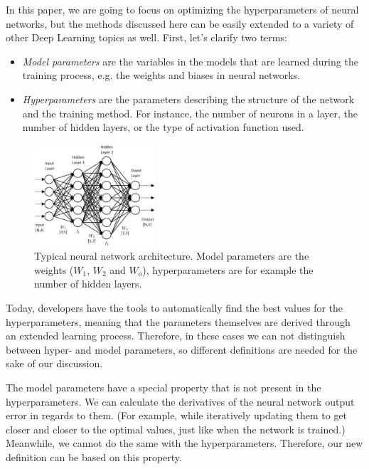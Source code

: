 \documentclass[conference]{IEEEtran}
\begin{document}
In this paper, we are going to focus on optimizing the hyperparameters of neural networks, but the methods discussed  here can be easily extended to a variety of other Deep Learning topics as well. First, let’s clarify two terms:
\begin{itemize}
    \item \emph{Model parameters} are the variables in the models that are learned during the training process, e.g. the weights and biases in neural networks.
    \item \emph{Hyperparameters} are the parameters describing the structure of the network and the training method. For instance, the number of neurons in a layer, the number of hidden layers, or the type of activation function used.
\end{itemize}

\begin{figure}[htbp]
\centerline{\includegraphics[width=0.4\textwidth]{nn.PNG}}
\caption{Typical neural network architecture. \cite{nn_arch} Model parameters are the weights ($W_{1}$, $W_{2}$ and $W_{o}$), hyperparameters are for example the number of hidden layers.}
\label{nn}
\end{figure}

Today, developers have the tools to automatically find the best values for the hyperparameters, meaning that the parameters themselves are derived through an extended learning process. Therefore, in these cases we can not distinguish between hyper- and model parameters, so different definitions are needed for the sake of our discussion.

The model parameters have a special property that is not present in the hyperparameters. We can calculate the derivatives of the neural network output error in regards to them. (For example, while iteratively updating them to get closer and closer to the optimal values, just like when the network is trained.) Meanwhile, we cannot do the same with the hyperparameters. Therefore, our new definition can be based on this property.
\end{document}
